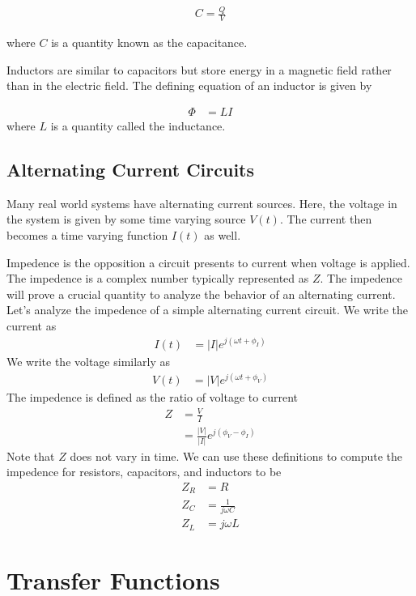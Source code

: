 \documentclass[book.tex]{subfiles}
\begin{document}
\begin{align}
C = \frac{Q}{V}
\end{align}

where $C$ is a quantity known as the capacitance.

Inductors are similar to capacitors but store energy in a magnetic field rather than in the electric field. The defining equation of an inductor is given by

\begin{align}
\Phi &= LI
\end{align}
where $L$ is a quantity called the inductance.

\subsection{Alternating Current Circuits}

Many real world systems have alternating current sources. Here, the voltage in the system is given by some time varying source $V(t)$. The current then becomes a time varying function $I(t)$ as well.

Impedence is the opposition a circuit presents to current when voltage is applied. The impedence is a complex number typically represented as $Z$. The impedence will prove a crucial quantity to analyze the behavior of an alternating current. Let's analyze the impedence of a simple alternating current circuit. We write the current as
\begin{align}
I(t)  &= |I|e^{j(\omega t + \phi_I)}
\end{align}
We write the voltage similarly as
\begin{align}
V(t) &= |V|e^{j(\omega t + \phi_V)}
\end{align}
The impedence is defined as the ratio of voltage to current
\begin{align}
Z &= \frac{V}{I} \\
&= \frac{|V|}{|I|}e^{j(\phi_V-\phi_I)}
\end{align}
Note that $Z$ does not vary in time. We can use these definitions to compute the impedence for resistors, capacitors, and inductors to be
\begin{align}
    Z_R &= R\\ 
    Z_C &= \frac{1}{j\omega C} \\
    Z_L &= j\omega L
\end{align}

\section{Transfer Functions}
\end{document}
